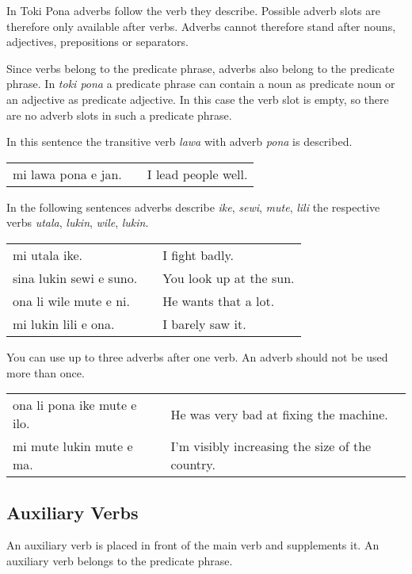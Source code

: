 In Toki Pona adverbs follow the verb they describe. 
Possible adverb slots are therefore only available after verbs.
Adverbs cannot therefore stand after nouns, adjectives, prepositions or separators. 

Since verbs belong to the predicate phrase, adverbs also belong to the predicate phrase.
In \textit{toki pona} a predicate phrase can contain a noun as predicate noun or an adjective as predicate adjective. 
In this case the verb slot is empty, so there are no adverb slots in such a predicate phrase. 

In this sentence the transitive verb \textit{lawa} with adverb \textit{pona} is described. 

\begin{supertabular}{p{5,5cm}|ll}
mi lawa pona e jan. && I lead people well. \\
\end{supertabular} 

In the following sentences adverbs describe \textit{ike}, \textit{sewi}, \textit{mute}, \textit{lili} the respective verbs \textit{utala}, \textit{lukin}, \textit{wile}, \textit{lukin}.

\begin{supertabular}{p{5,5cm}|ll}
mi utala ike. && I fight badly. \\
sina lukin sewi e suno. && You look up at the sun. \\
ona li wile mute e ni. && He wants that a lot. \\
mi lukin lili e ona. && I barely saw it. \\
\end{supertabular} 

You can use up to three adverbs after one verb. 
An adverb should not be used more than once. 

\begin{supertabular}{p{5,5cm}|ll}
ona li pona ike mute e ilo. && He was very bad at fixing the machine. \\
mi mute lukin mute e ma. && I'm visibly increasing the size of the country. \\
\end{supertabular}

%
{}
\subsection*{Auxiliary Verbs}
%
An auxiliary verb is placed in front of the main verb and supplements it. 
An auxiliary verb belongs to the predicate phrase. 

